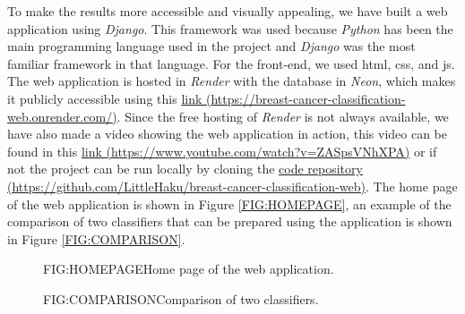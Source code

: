 
To make the results more accessible and visually appealing, we have built a web application using \textit{Django}. This framework was used because \textit{Python} has been the main programming language used in the project and \textit{Django} was the most familiar framework in that language. For the front-end, we used \ac{html}, \ac{css}, and \ac{js}. The web application is hosted in \textit{Render} with the database in \textit{Neon}, which makes it publicly accessible using this \href{https://breast-cancer-classification-web.onrender.com/}{link (https://breast-cancer-classification-web.onrender.com/)}. Since the free hosting of \textit{Render} is not always available, we have also made a video showing the web application in action, this video can be found in this \href{https://www.youtube.com/watch?v=ZASpsVNhXPA}{link (https://www.youtube.com/watch?v=ZASpsVNhXPA)} or if not the project can be run locally by cloning the \href{https://github.com/LittleHaku/breast-cancer-classification-web}{code repository (https://github.com/LittleHaku/breast-cancer-classification-web)}.
The home page of the web application is shown in Figure \ref{FIG:HOMEPAGE}, an example of the comparison of two classifiers that can be prepared using the application is shown in Figure \ref{FIG:COMPARISON}.

\begin{figure}[Web Application]{FIG:HOMEPAGE}{Home page of the web application.}
\end{figure}

\begin{figure}[Web Application]{FIG:COMPARISON}{Comparison of two classifiers.}
\end{figure}